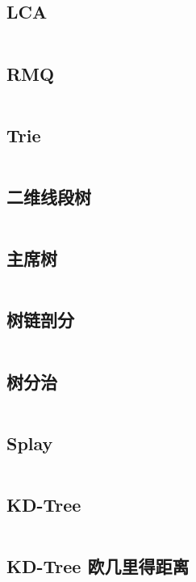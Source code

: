 \documentclass[titlepage,landscape,a4paper,10pt]{article}
\begin{document}
\begin{multicols}{2}
\begin{spacing}{0.8}
\subsection{LCA}
\inputminted{cpp}{DataStructure/LCA.cpp}

\subsection{RMQ}
\inputminted{cpp}{DataStructure/RMQ.cpp}

\subsection{Trie}
\inputminted{cpp}{DataStructure/trie.cpp}

\subsection{二维线段树}
\inputminted{cpp}{DataStructure/二维线段树.cpp}

\subsection{主席树}
\inputminted{cpp}{DataStructure/主席树.cpp}

\subsection{树链剖分}
\inputminted{cpp}{DataStructure/树链剖分.cpp}

\subsection{树分治}
\inputminted{cpp}{DataStructure/树分治.cpp}

\subsection{Splay}
\inputminted{cpp}{DataStructure/Splay.cpp}

\subsection{KD-Tree}
\inputminted{cpp}{DataStructure/KDT.cpp}

\subsection{KD-Tree 欧几里得距离}
\inputminted{cpp}{DataStructure/KDT2.cpp}



\end{spacing}
\end{multicols}
\end{document}
